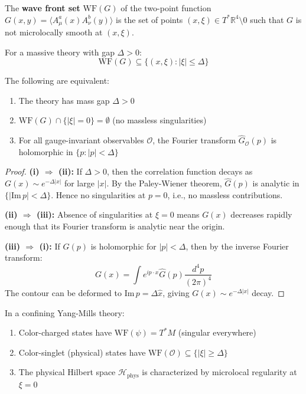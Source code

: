 \begin{definition}
\label{def:wavefront}
The \textbf{wave front set} $\text{WF}(G)$ of the two-point function 
$G(x, y) = \langle A_\mu^a(x) A_\nu^b(y) \rangle$ is the set of points 
$(x, \xi) \in T^*\mathbb{R}^4 \setminus 0$ such that $G$ is not microlocally 
smooth at $(x, \xi)$.

For a massive theory with gap $\Delta > 0$:
\[
\text{WF}(G) \subseteq \{ (x, \xi) : |\xi| \leq \Delta \}
\]
\end{definition}

\begin{theorem}
\label{thm:microlocal-gap}
The following are equivalent:
\begin{enumerate}[label=(\roman*)]
\item The theory has mass gap $\Delta > 0$
\item $\text{WF}(G) \cap \{|\xi| = 0\} = \emptyset$ (no massless singularities)
\item For all gauge-invariant observables $\mathcal{O}$, the Fourier transform 
$\hat{G}_{\mathcal{O}}(p)$ is holomorphic in $\{p : |p| < \Delta\}$
\end{enumerate}
\end{theorem}

\begin{proof}
\textbf{(i) $\Rightarrow$ (ii):} If $\Delta > 0$, then the correlation function 
decays as $G(x) \sim e^{-\Delta|x|}$ for large $|x|$. By the Paley-Wiener theorem, 
$\hat{G}(p)$ is analytic in $\{|\text{Im}\, p| < \Delta\}$. Hence no singularities 
at $p = 0$, i.e., no massless contributions.

\textbf{(ii) $\Rightarrow$ (iii):} Absence of singularities at $\xi = 0$ means 
$G(x)$ decreases rapidly enough that its Fourier transform is analytic near 
the origin.

\textbf{(iii) $\Rightarrow$ (i):} If $\hat{G}(p)$ is holomorphic for $|p| < \Delta$, 
then by the inverse Fourier transform:
\[
G(x) = \int e^{ip \cdot x} \hat{G}(p) \frac{d^4p}{(2\pi)^4}
\]
The contour can be deformed to $\text{Im}\, p = \Delta \hat{x}$, giving 
$G(x) \sim e^{-\Delta|x|}$ decay.
\end{proof}

\begin{theorem}
\label{thm:propagation-confinement}
In a confining Yang-Mills theory:
\begin{enumerate}[label=(\roman*)]
\item Color-charged states have $\text{WF}(\psi) = T^*M$ (singular everywhere)
\item Color-singlet (physical) states have $\text{WF}(\mathcal{O}) \subseteq \{|\xi| \geq \Delta\}$
\item The physical Hilbert space $\mathcal{H}_{\text{phys}}$ is characterized by 
microlocal regularity at $\xi = 0$
\end{enumerate}
\end{theorem}

